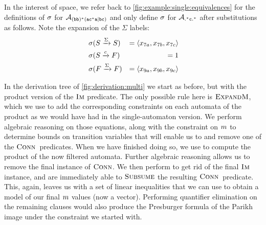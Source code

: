 \documentclass[acmsmall,review,anonymous,screen]{acmart}\settopmatter{printfolios=true,printccs=true,printacmref=true}
\theoremstyle{definition}
\begin{document}
In the interest of space, we refer back to
\cref{fig:example:single:equivalences} for the definitions of $\operatorname{\sigma}$ for
$\mathcal{A}_{\mathtt{(bb)^\ast(ac^\ast{}a|bc)}}$ and only define $\operatorname{\sigma}$ for $\mathcal{A}_{\mathtt{.^\ast{}c.^\ast}}{}$ after
substitutions as follows. Note the expansion of the $\Sigma$ labels:
    \begin{equation*}
      \begin{aligned}
        & \operatorname{\sigma}(S \xrightarrow{\Sigma} S) & = \left\langle x_{7a}, x_{7b}, x_{7c}\right\rangle \\
        & \operatorname{\sigma}(S \xrightarrow{c} F) & = 1 \\
        & \operatorname{\sigma}(F \xrightarrow{\Sigma} F) & = \left\langle x_{9a}, x_{9b}, x_{9c}\right\rangle \\
      \end{aligned}
    \end{equation*}
    
In the derivation tree of \cref{fig:derivation:multi} we start as before, but
with the product version of the $\operatorname{\textsc{Im}}$ predicate. The only possible rule here
is $\textsc{ExpandM}$, which we use to add the corresponding constraints on each
automata of the product as we would have had in the single-automaton version. We
perform algebraic reasoning on those equations, along with the constraint on
$m$ to determine bounds on transition variables that will enable us
to \Subsume{} and remove one of the $\operatorname{\textsc{Conn}}{}$ predicates. When we have
finished doing so, we use \Materialise{} to compute the product of the now
filtered automata. Further algebraic reasoning allows us to remove the final
instance of $\operatorname{\textsc{Conn}}$. We then perform \Expand{} to get rid of the final
$\operatorname{\textsc{Im}}$ instance, and are immediately able to $\textsc{Subsume}$ the resulting
$\operatorname{\textsc{Conn}}{}$ predicate. This, again, leaves us with a set of linear
inequalities that we can use to obtain a model of our final $m$
values (now a vector). Performing quantifier elimination on the remaining clauses would also produce the Presburger formula of the Parikh image under the constraint we started with.
\end{document}
